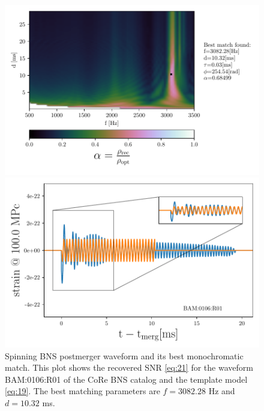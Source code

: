 \begin{figure}[!htbp]
\begin{center}
\begin{minipage}[t]{0.5\linewidth}
\vspace{0pt}
\includegraphics[scale=0.6,trim={2mm 0 35mm 0},clip]{images/Data_analysis/results/2D_grid_5.pdf}
\end{minipage}%
\begin{minipage}[t]{0.5\linewidth}
\vspace{20pt}
\includegraphics[scale=0.45]{images/Data_analysis/results/2D_grid_6.pdf}
\end{minipage}
\captionsetup{width=0.8\textwidth}
\caption[Spinning BNS system's postmerger waveform and its best monochromatic match]{Spinning BNS postmerger waveform and its best monochromatic match. This plot shows the recovered SNR \ref{eq:21} for the waveform BAM:0106:R01 of the CoRe BNS catalog \cite{Dietrich:2018phi} and the template model \ref{eq:19}. The best matching parameters are $f=3082.28$ Hz and $d=10.32$ ms.}
\label{spi}
\end{center}
\end{figure}

